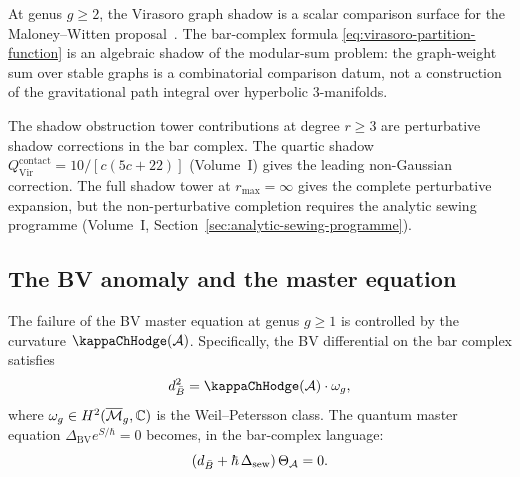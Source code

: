 \begin{remark}
At genus $g \geq 2$, the Virasoro graph shadow is a scalar comparison
surface for the Maloney--Witten proposal~\cite{MW10}. The
bar-complex formula \eqref{eq:virasoro-partition-function} is an
algebraic shadow of the modular-sum problem: the graph-weight sum over
stable graphs is a combinatorial comparison datum, not a construction
of the gravitational path integral over hyperbolic $3$-manifolds.

The shadow obstruction tower contributions at degree $r \geq 3$ are
perturbative shadow corrections in the bar complex. The
quartic shadow $Q^{\mathrm{contact}}_{\mathrm{Vir}} = 10/[c(5c+22)]$
(Volume~I) gives the leading non-Gaussian correction. The full shadow
tower at $r_{\max} = \infty$ gives the complete perturbative expansion,
but the non-perturbative completion requires the analytic sewing
programme (Volume~I, Section~\ref*{sec:analytic-sewing-programme}).
\end{remark}

\subsection{The BV anomaly and the master equation}

\begin{theorem}
The failure of the BV master equation at genus $g \geq 1$ is controlled
by the curvature $\kappaChHodge(\cA)$. Specifically, the BV differential
on the bar complex satisfies
\[
d_{\barB}^2 = \kappaChHodge(\cA) \cdot \omega_g,
\]
where $\omega_g \in H^2(\overline{\mathcal{M}}_g, \mathbb{C})$ is the Weil--Petersson class.
The quantum master equation $\Delta_{\mathrm{BV}} e^{S/\hbar} = 0$
becomes, in the bar-complex language:
\[
(d_{\bar{B}} + \hbar \, \Delta_{\mathrm{sew}}) \, \Theta_{\mathcal{A}} = 0.
\]
\end{theorem}

